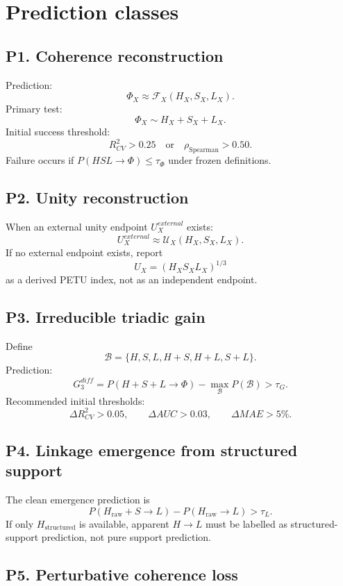 \documentclass[11pt,a4paper]{article}
\newcommand{\Hraw}{H_{\mathrm{raw}}}
\newcommand{\Hstr}{H_{\mathrm{structured}}}
\begin{document}
\section{Prediction classes}

\subsection{P1. Coherence reconstruction}

Prediction:
\[
\Phi_X\approx\mathcal{F}_X(H_X,S_X,L_X).
\]
Primary test:
\[
\Phi_X\sim H_X+S_X+L_X.
\]
Initial success threshold:
\[
R^2_{CV}>0.25
\quad\text{or}\quad
\rho_{\mathrm{Spearman}}>0.50.
\]
Failure occurs if $P(HSL\rightarrow\Phi)\leq\tau_\Phi$ under frozen definitions.

\subsection{P2. Unity reconstruction}

When an external unity endpoint $U_X^{external}$ exists:
\[
U_X^{external}\approx\mathcal{U}_X(H_X,S_X,L_X).
\]
If no external endpoint exists, report
\[
U_X=(H_XS_XL_X)^{1/3}
\]
as a derived PETU index, not as an independent endpoint.

\subsection{P3. Irreducible triadic gain}

Define
\[
\mathcal{B}=\{H,S,L,H+S,H+L,S+L\}.
\]
Prediction:
\[
G_3^{diff}=P(H+S+L\rightarrow\Phi)-\max_{\mathcal{B}}P(\mathcal{B})>\tau_G.
\]
Recommended initial thresholds:
\[
\Delta R^2_{CV}>0.05,\qquad \Delta AUC>0.03,\qquad \Delta MAE>5\%.
\]

\subsection{P4. Linkage emergence from structured support}

The clean emergence prediction is
\[
P(\Hraw+S\rightarrow L)-P(\Hraw\rightarrow L)>\tau_L.
\]
If only $\Hstr$ is available, apparent $H\rightarrow L$ must be labelled as structured-support prediction, not pure support prediction.

\subsection{P5. Perturbative coherence loss}
\end{document}
